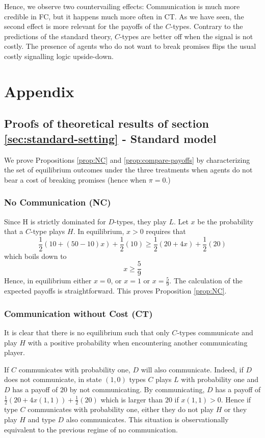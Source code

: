 \documentclass[12pt]{article}
\theoremstyle{break}
\begin{document}
Hence, we observe two countervailing effects: Communication is much more credible in FC, but it happens much more often in CT. As we have seen, the second effect is more relevant for the payoffs of the $C$-types. Contrary to the predictions of the standard theory, $C$-types are better off when the signal is not costly. The presence of agents who do not want to break promises flips the usual costly signalling logic upside-down.




%   
%    
\appendix
\section{Appendix}
\subsection{Proofs of theoretical results of section \ref{sec:standard-setting} - Standard model}
We prove Propositions \ref{prop:NC} and \ref{prop:compare-payoffs} by characterizing the set of equilibrium outcomes under the three treatments when agents do not bear a cost of breaking promises (hence when $\pi=0$.)

\subsubsection*{No Communication (NC)}
Since H is strictly dominated for $D$-types, they play $L$. Let $x$ be the probability that a $C$-type plays $H$. In equilibrium, $x>0$ requires that
\[
	\frac{1}{2}(10+(50-10)x)+\frac{1}{2}(10)\geq \frac{1}{2}(20+4 x)+\frac{1}{2}(20)
\]
which boils down to\[
x\geq \frac{5}{9}
	\]
Hence, in equilibrium either $x=0$, or $x=1$ or $x=\frac{5}{9}$. The calculation of the expected payoffs is straightforward. This proves Proposition \ref{prop:NC}.

\subsubsection*{Communication without Cost (CT)}
It is clear that there is no equilibrium such that only $C$-types communicate and play $H$ with a positive probability when encountering another communicating player. 

If $C$ communicates with probability one, $D$ will also communicate. Indeed, if $D$ does not communicate, in state $(1,0)$ types $C$ plays $L$ with  probability one and $D$ has a payoff of $20$ by not communicating. By communicating, $D$ has a payoff of $\frac{1}{2}(20+4x(1,1))+\frac{1}{2}(20)$ which is larger than $20$ if $x(1,1)>0$. Hence if type $C$ communicates with probability one, either they do not play $H$ or they play $H$ and type $D$ also communicates. This situation is observationally equivalent to the previous regime of no communication.
\end{document}
